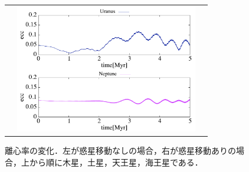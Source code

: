 \documentclass[11pt,a4paper,oneside,onecolumn]{jreport}
\begin{document}
\begin{figure}[H]
\begin{tabular}{ccc}
\begin{minipage}[t]{0.1\hsize}
\end{minipage} &
\begin{minipage}[t]{0.45\hsize}
\centering
\includegraphics[width=8cm]{./image/Move500kyr_ecc_5Myr_URANEP.pdf}
\end{minipage}
%
\end{tabular}
\caption{離心率の変化．左が惑星移動なしの場合，右が惑星移動ありの場合，上から順に木星，土星，天王星，海王星である．\label{fig:ecc}}
\end{figure}
\end{document}
